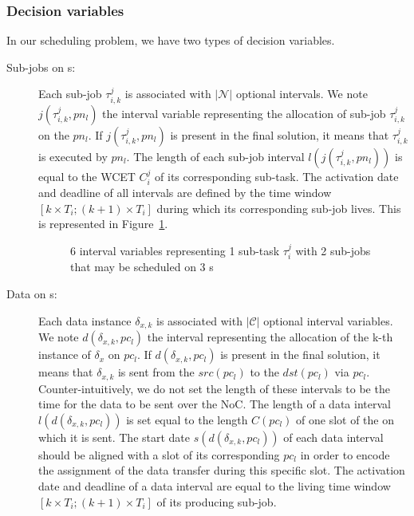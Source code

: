 \documentclass[main.tex]{subfiles}
\begin{document}
\subsubsection{Decision variables}
\label{sssec_validation_decisionVariables}
In our scheduling problem, we have two types of decision variables. 
\begin{description}
    \item[Sub-jobs on \PN{}s:] Each sub-job $\tau_{i,k}^j$ is associated with $|\mathcal{N}|$ optional intervals. We note $j(\tau_{i,k}^j , pn_l)$ the interval variable representing the allocation of sub-job $\tau_{i,k}^j$ on the \PN{} $pn_l$. If $j(\tau_{i,k}^j , pn_l)$ is present in the final solution, it means that $\tau_{i,k}^j$ is executed by \PN{} $pn_l$. The length of each sub-job interval $l(j(\tau_{i,k}^j , pn_l))$ is equal to the WCET $C_i^j$ of its corresponding sub-task. The activation date and deadline of all intervals are defined by the time window $[k \times T_i ; (k+1) \times T_i ]$ during which its corresponding sub-job lives. This is represented in Figure~\ref{fig_validation_decVarJobs}.

        \begin{figure}
            \centering
            \scalebox{0.9}{}
            \caption{6 interval variables representing 1 sub-task $\tau_i^j$ with 2 sub-jobs that may be scheduled on 3 \PN{}s  }
            \label{fig_validation_decVarJobs}
        \end{figure}

    \item[Data on \PC{}s:] Each data instance $\delta_{x,k}$ is associated with $|\mathcal{C}|$ optional interval variables. We note $d(\delta_{x,k} , pc_l)$ the interval representing the allocation of the k-th instance of $\delta_x$ on \PC{} $pc_l$. If $d(\delta_{x,k} , pc_l)$ is present in the final solution, it means that $\delta_{x,k}$ is sent from the \PN{} $src(pc_l)$ to the \PN{} $dst(pc_l)$ via $pc_l$. Counter-intuitively, we do not set the length of these intervals to be the time for the data to be sent over the NoC. The length of a data interval $l(d(\delta_{x,k} , pc_l))$ is set equal to the length $C(pc_l)$ of one slot of the \PC{} on which it is sent. The start date $s(d(\delta_{x,k} , pc_l))$ of each data interval should be aligned with a slot of its corresponding \PC{} $pc_l$ in order to encode the assignment of the data transfer during this specific slot. The activation date and deadline of a data interval are equal to the living time window $[k \times T_i ; (k+1) \times T_i ]$ of its producing sub-job.
\end{description}
\end{document}
